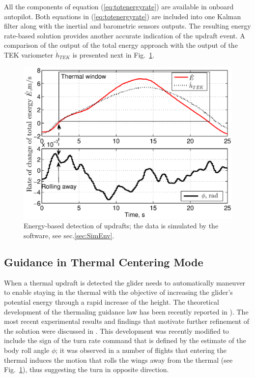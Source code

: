\documentclass{ifacconf}
\newcommand{\squeezeup}{\vspace{-3.0mm}}
\begin{document}
All the components of equation (\ref{eq:totenergyrate}) are available in
onboard autopilot. Both equations in (\ref{eq:totenergyrate}) are included
into one Kalman filter along with the inertial and barometric sensors
outputs. The resulting energy rate-based solution provides another accurate
indication of the updraft event. A comparison of the output of the total
energy approach with the output of the TEK variometer $\dot{h}_{TEK}$ is
presented next in Fig.~\ref{fig:ThermalDetection}.
\begin{figure}[thpb]
  \centering
  \includegraphics[scale=0.44]{Figures/TEK_Bank_2.eps}
  \caption{Energy-based detection of updrafts; the data is simulated
  by the~\cite{Condor:2013:Online} software, see sec.\ref{sec:SimEnv}.}
  \label{fig:ThermalDetection}
\end{figure}
\squeezeup

\subsection{Guidance in Thermal Centering Mode}
\label{subsec:ThermGuidance}
\squeezeup

When a thermal updraft is detected the glider needs to automatically maneuver
to enable staying in the thermal with the objective of increasing the
glider's potential energy through a rapid increase of the height. The
theoretical development of the thermaling guidance law has been recently
reported in \cite{AKlass_JGCD:2012}). The most recent experimental results
and findings that motivate further refinement of the solution were discussed
in \cite{AKlass_CDC:2012}. This development was recently modified to include
the sign of the turn rate command that is defined by the estimate of the body
roll angle $\phi$; it was observed in a number of flights that entering the
thermal induces the motion that rolls the wings away from the thermal (see
Fig.~\ref{fig:ThermalDetection}), thus suggesting the turn in opposite
direction.
\end{document}
